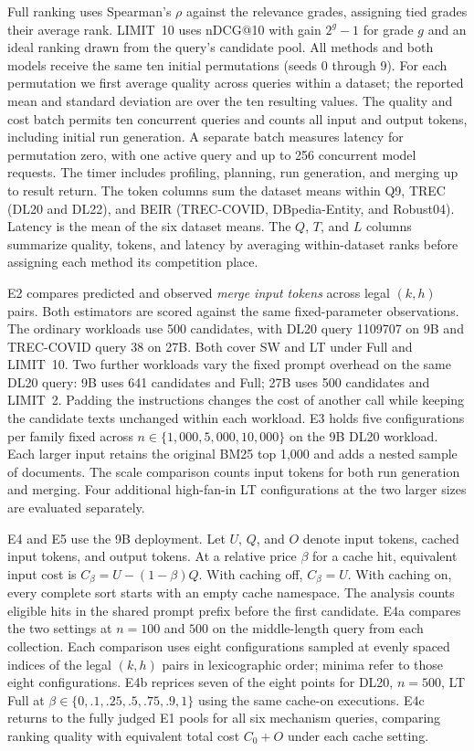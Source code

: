 Full ranking uses Spearman's $\rho$ against the relevance grades, assigning tied grades their average rank. \textsf{LIMIT}~10 uses nDCG@10 with gain $2^{g}-1$ for grade $g$ and an ideal ranking drawn from the query's candidate pool.
All methods and both models receive the same ten initial permutations (seeds 0 through 9).
For each permutation we first average quality across queries within a dataset; the reported mean and standard deviation are over the ten resulting values.
The quality and cost batch permits ten concurrent queries and counts all input and output tokens, including initial run generation.
A separate batch measures latency for permutation zero, with one active query and up to 256 concurrent model requests. The timer includes profiling, planning, run generation, and merging up to result return.
The token columns sum the dataset means within Q9, TREC (DL20 and DL22), and BEIR (TREC-COVID, DBpedia-Entity, and Robust04). Latency is the mean of the six dataset means. The $Q$, $T$, and $L$ columns summarize quality, tokens, and latency by averaging within-dataset ranks before assigning each method its competition place.

E2 compares predicted and observed \emph{merge input tokens} across legal $(k,h)$ pairs. Both estimators are scored against the same fixed-parameter observations. The ordinary workloads use 500 candidates, with DL20 query 1109707 on 9B and TREC-COVID query 38 on 27B. Both cover SW and LT under Full and \textsf{LIMIT}~10.
Two further workloads vary the fixed prompt overhead on the same DL20 query: 9B uses 641 candidates and Full; 27B uses 500 candidates and \textsf{LIMIT}~2. Padding the instructions changes the cost of another call while keeping the candidate texts unchanged within each workload.
E3 holds five configurations per family fixed across $n\in\{1{,}000,5{,}000,10{,}000\}$ on the 9B DL20 workload. Each larger input retains the original BM25 top 1,000 and adds a nested sample of documents. The scale comparison counts input tokens for both run generation and merging. Four additional high-fan-in LT configurations at the two larger sizes are evaluated separately.

E4 and E5 use the 9B deployment. Let $U$, $Q$, and $O$ denote input tokens, cached input tokens, and output tokens. At a relative price $\beta$ for a cache hit, equivalent input cost is $C_\beta=U-(1-\beta)Q$.
With caching off, $C_\beta=U$. With caching on, every complete sort starts with an empty cache namespace. The analysis counts eligible hits in the shared prompt prefix before the first candidate.
E4a compares the two settings at $n=100$ and $500$ on the middle-length query from each collection. Each comparison uses eight configurations sampled at evenly spaced indices of the legal $(k,h)$ pairs in lexicographic order; minima refer to those eight configurations.
E4b reprices seven of the eight points for DL20, $n=500$, LT Full at $\beta\in\{0,.1,.25,.5,.75,.9,1\}$ using the same cache-on executions.
E4c returns to the fully judged E1 pools for all six mechanism queries, comparing ranking quality with equivalent total cost $C_0+O$ under each cache setting.

